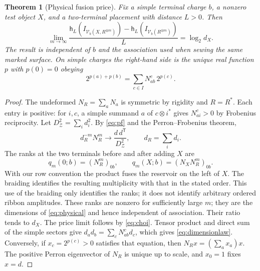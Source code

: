 \documentclass[11pt]{article}
\numberwithin{equation}{section}
\newtheorem{theorem}{Theorem}[section]
\theoremstyle{definition}
\theoremstyle{remark}
\newcommand{\Center}{\mathcal Z}
\newcommand{\State}{\mathcal V}
\begin{document}
\begin{theorem}[Physical fusion price]\label{thm:fusion}
Fix a simple terminal charge \(b\), a nonzero test object \(X\), and a two-terminal placement with distance \(L>0\). Then
\begin{equation}\label{eq:fusionlimit}
 \lim_{m\to\infty}
 \frac{\mathsf h_L(I_{\State_b(X,R^{\otimes m})})
       -\mathsf h_L(I_{\State_b(R^{\otimes m})})}{L}
   =\log_2 d_X .
\end{equation}
The result is independent of \(b\) and the association used when sewing the same marked surface. On simple charges the right-hand side is the unique real function \(p\) with \(p(0)=0\) obeying
\begin{equation}\label{eq:dimensionlaw}
  2^{p(a)+p(b)}=\sum_{c\in I}N_{ab}^{c}\,2^{p(c)} .
\end{equation}
\end{theorem}

\begin{proof}
The undeformed \(N_R=\sum_a N_a\) is symmetric by rigidity and \(R=R^*\). Each entry is positive: for \(i,c\), a simple summand \(a\) of \(c\otimes i^*\) gives \(N_{a i}^{c}>0\) by Frobenius reciprocity. Let \(D_{\Center}^2=\sum_i d_i^2\). By \eqref{eq:pf} and the Perron--Frobenius theorem,
\[
 d_R^{-m}N_R^m\longrightarrow
      \frac{d\,d^{\mathsf T}}{D_{\Center}^2},
 \qquad
 d_R=\sum_i d_i .
\]
The ranks at the two terminals before and after adding \(X\) are
\[
 q_m(0;b)=(N_R^m)_{0b},\qquad
 q_m(X;b)=(N_XN_R^m)_{0b}.
\]
With our row convention the product fuses the reservoir on the left of \(X\). The braiding identifies the resulting multiplicity with that in the stated order. This use of the braiding only identifies the ranks; it does not identify arbitrary ordered ribbon amplitudes. These ranks are nonzero for sufficiently large \(m\); they are the dimensions of \eqref{eq:physical} and hence independent of association. Their ratio tends to \(d_X\). The price limit follows by \eqref{eq:choi}. Tensor product and direct sum of the simple sectors give \(d_a d_b=\sum_c N_{ab}^{c}d_c\), which gives \eqref{eq:dimensionlaw}. Conversely, if \(x_c=2^{p(c)}>0\) satisfies that equation, then \(N_R x=(\sum_a x_a)x\). The positive Perron eigenvector of \(N_R\) is unique up to scale, and \(x_0=1\) fixes \(x=d\).
\end{proof}
\end{document}
